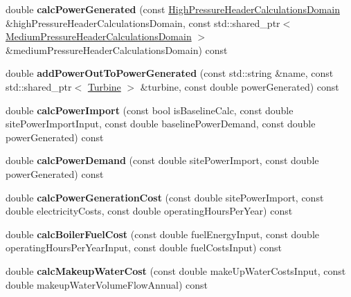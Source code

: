 \begin{DoxyCompactItemize}
double {\bfseries calc\+Power\+Generated} (const \hyperlink{class_high_pressure_header_calculations_domain}{High\+Pressure\+Header\+Calculations\+Domain} \&high\+Pressure\+Header\+Calculations\+Domain, const std\+::shared\+\_\+ptr$<$ \hyperlink{class_medium_pressure_header_calculations_domain}{Medium\+Pressure\+Header\+Calculations\+Domain} $>$ \&medium\+Pressure\+Header\+Calculations\+Domain) const
\item 
\mbox{\label{class_energy_and_cost_calculator_acea571a402a377985753ebfaebad6fcc}} 
double {\bfseries add\+Power\+Out\+To\+Power\+Generated} (const std\+::string \&name, const std\+::shared\+\_\+ptr$<$ \hyperlink{class_turbine}{Turbine} $>$ \&turbine, const double power\+Generated) const
\item 
\mbox{\label{class_energy_and_cost_calculator_ad96cc7f912704f33786868447da091c3}} 
double {\bfseries calc\+Power\+Import} (const bool is\+Baseline\+Calc, const double site\+Power\+Import\+Input, const double baseline\+Power\+Demand, const double power\+Generated) const
\item 
\mbox{\label{class_energy_and_cost_calculator_a550d20d74d601e4f5e28e70f25565593}} 
double {\bfseries calc\+Power\+Demand} (const double site\+Power\+Import, const double power\+Generated) const
\item 
\mbox{\label{class_energy_and_cost_calculator_a9618725f55b74948cb1eaf8e79ddf1c6}} 
double {\bfseries calc\+Power\+Generation\+Cost} (const double site\+Power\+Import, const double electricity\+Costs, const double operating\+Hours\+Per\+Year) const
\item 
\mbox{\label{class_energy_and_cost_calculator_aa5a5f91e9ed5dab198eda79fc5b18d53}} 
double {\bfseries calc\+Boiler\+Fuel\+Cost} (const double fuel\+Energy\+Input, const double operating\+Hours\+Per\+Year\+Input, const double fuel\+Costs\+Input) const
\item 
\mbox{\label{class_energy_and_cost_calculator_a5d919bd8a35b867cd3c1cd356906c77c}} 
double {\bfseries calc\+Makeup\+Water\+Cost} (const double make\+Up\+Water\+Costs\+Input, const double makeup\+Water\+Volume\+Flow\+Annual) const

\end{DoxyCompactItemize}
